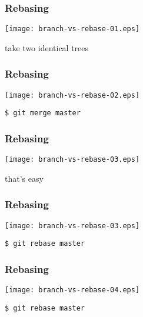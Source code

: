 \documentclass[english]{beamer}
\newcommand{\CMD}[1]{%
\texttt{\textcolor{code-blue}{#1}}%
}
\begin{document}
\begin{frame}
\frametitle{Rebasing}

\texttt{[image: branch-vs-rebase-01.eps]}
\vspace{\baselineskip}
\begin{center}
        take two identical trees
\end{center}
\vspace{\textheight}
\end{frame}

\begin{frame}
\frametitle{Rebasing}

\texttt{[image: branch-vs-rebase-02.eps]}
\vspace{\baselineskip}
\begin{flushleft}
        \CMD{\$ git merge master}
\end{flushleft}
\vspace{\textheight}
\end{frame}

\begin{frame}
\frametitle{Rebasing}

\texttt{[image: branch-vs-rebase-03.eps]}
\vspace{\baselineskip}
\begin{center}
        that's easy
\end{center}
\vspace{\textheight}
\end{frame}

\begin{frame}
\frametitle{Rebasing}

\texttt{[image: branch-vs-rebase-03.eps]}
\vspace{\baselineskip}
\begin{flushright}
        \CMD{\$ git rebase master}
\end{flushright}
\vspace{\textheight}
\end{frame}

\begin{frame}
\frametitle{Rebasing}

\texttt{[image: branch-vs-rebase-04.eps]}
\vspace{\baselineskip}
\begin{flushright}
        \CMD{\$ git rebase master}
\end{flushright}
\vspace{\textheight}
\end{frame}
\end{document}

